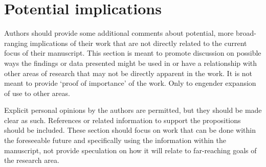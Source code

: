 \documentclass[a4paper,num-refs]{oup-contemporary}
\begin{document}
\section{Potential implications}

Authors should provide some additional comments about potential, more broad-ranging implications of their work that are not directly related to the current focus of their manuscript. This section is meant to promote discussion on possible ways the findings or data presented might be used in or have a relationship with other areas of research that may not be directly apparent in the work. It is not meant to provide `proof of importance' of the work. Only to engender expansion of use to other areas.

Explicit personal opinions by the authors are permitted, but they should be made clear as such. References or related information to support the propositions should be included. These section should focus on work that can be done within the foreseeable future and specifically using the information within the manuscript, not provide speculation on how it will relate to far-reaching goals of the research area.
\end{document}
